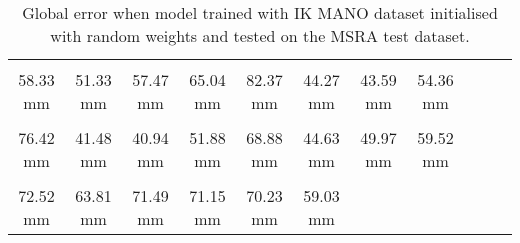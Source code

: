 \begin{table}[!ht]
    \begin{tabular}{|c|c|c|c|c|c|c|c|c|c|c|}
    \hline
    \cellcolor[HTML]{ffbf00}{\bfseries Wrist} & \cellcolor[HTML]{ffbf00}{\bfseries IMCP} & \cellcolor[HTML]{ffbf00}{\bfseries IPIP} & \cellcolor[HTML]{ff8000}{\bfseries IDIP} & \cellcolor[HTML]{ff2500}{\bfseries ITIP} & \cellcolor[HTML]{ffff00}{\bfseries MMCP} & \cellcolor[HTML]{ffff00}{\bfseries MPIP} & \cellcolor[HTML]{ffbf00}{\bfseries MDIP}  \\
    \cellcolor[HTML]{ffbf00}$\,\,\,$58.33 mm & \cellcolor[HTML]{ffbf00}$\,\,\,$51.33 mm & \cellcolor[HTML]{ffbf00}$\,\,\,$57.47 mm & \cellcolor[HTML]{ff8000}$\,\,\,$65.04 mm & \cellcolor[HTML]{ff2500}$\,\,\,$82.37 mm & \cellcolor[HTML]{ffff00}$\,\,\,$44.27 mm & \cellcolor[HTML]{ffff00}$\,\,\,$43.59 mm & \cellcolor[HTML]{ffbf00}$\,\,\,$54.36 mm\\
    \hline
    \cellcolor[HTML]{ff7500}{\bfseries MTIP} & \cellcolor[HTML]{ffff00}{\bfseries RMCP} & \cellcolor[HTML]{ffff00}{\bfseries RPIP} & \cellcolor[HTML]{ffbf00}{\bfseries RDIP} & \cellcolor[HTML]{ff8000}{\bfseries RTIP} & \cellcolor[HTML]{ffff00}{\bfseries PMCP} & \cellcolor[HTML]{ffff00}{\bfseries PPIP} & \cellcolor[HTML]{ffbf00}{\bfseries PDIP}  \\
    \cellcolor[HTML]{ff7500}$\,\,\,$76.42 mm & \cellcolor[HTML]{ffff00}$\,\,\,$41.48 mm & \cellcolor[HTML]{ffff00}$\,\,\,$40.94 mm & \cellcolor[HTML]{ffbf00}$\,\,\,$51.88 mm & \cellcolor[HTML]{ff8000}$\,\,\,$68.88 mm & \cellcolor[HTML]{ffff00}$\,\,\,$44.63 mm & \cellcolor[HTML]{ffff00}$\,\,\,$49.97 mm & \cellcolor[HTML]{ffbf00}$\,\,\,$59.52 mm\\
    \hline
    \cellcolor[HTML]{ff7500}{\bfseries PTIP} & \cellcolor[HTML]{ff8000}{\bfseries TMCP} & \cellcolor[HTML]{ff7500}{\bfseries TPIP} & \cellcolor[HTML]{ff7500}{\bfseries PDIP} & \cellcolor[HTML]{ff7500}{\bfseries TTIP} & \cellcolor[HTML]{ffbf00}{\bfseries Average}  \\
    \cellcolor[HTML]{ff7500}$\,\,\,$72.52 mm & \cellcolor[HTML]{ff8000}$\,\,\,$63.81 mm & \cellcolor[HTML]{ff7500}$\,\,\,$71.49 mm & \cellcolor[HTML]{ff7500}$\,\,\,$71.15 mm & \cellcolor[HTML]{ff7500}$\,\,\,$70.23 mm & \cellcolor[HTML]{ffbf00}$\,\,\,$59.03 mm \\
    \cline{1-6}
    \end{tabular}
    \caption{Global error when model trained with IK MANO dataset initialised with random weights and tested on the MSRA test dataset.}
    \label{}
    \end{table}
